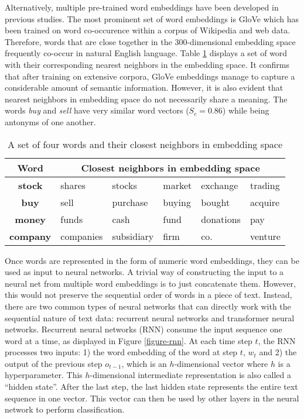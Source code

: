 Alternatively, multiple pre-trained word embeddings have been developed in previous studies. The most prominent set of word embeddings is GloVe  which has been trained on word co-occurence within a corpus of Wikipedia and web data. Therefore, words that are close together in the 300-dimensional embedding space frequently co-occur in natural English language. Table \ref{table-glove-demo} displays a set of word with their corresponding nearest neighbors in the embedding space. It confirms that after training on extensive corpora, GloVe embeddings manage to capture a considerable amount of semantic information. However, it is also evident that nearest neighbors in embedding space do not necessarily share a meaning. The words \emph{buy} and \emph{sell} have very similar word vectors ($S_c = 0.86$) while being antonyms of one another.




\begin{table}[!ht]
\centering

\begin{tabular}{clllll}
\toprule
\textbf{Word} & \multicolumn{5}{c}{\textbf{Closest neighbors in embedding space}}\\
\midrule

\textbf{stock} & shares & stocks & market & exchange & trading\\
\textbf{buy} & sell & purchase & buying & bought & acquire\\
\textbf{money} & funds & cash & fund & donations & pay\\
\textbf{company} & companies & subsidiary & firm & co. & venture\\

\bottomrule
\end{tabular}
\caption{A set of four words and their closest neighbors in embedding space}
\label{table-glove-demo}
\end{table}




%


Once words are represented in the form of numeric word embeddings, they can be used as input to neural networks. A trivial way of constructing the input to a neural net from multiple word embeddings is to just concatenate them. However, this would not preserve the sequential order of words in a piece of text. Instead, there are two common types of neural networks that can directly work with the sequential nature of text data: recurrent neural networks and transformer neural networks. Recurrent neural networks (RNN) consume the input sequence one word at a time, as displayed in Figure \ref{figure-rnn}. At each time step $t$, the RNN processes two inputs: 1) the word embedding of the word at step $t$, $w_t$ and 2) the output of the previous step $o_{t-1}$, which is an $h$-dimensional vector where $h$ is a hyperparameter. This $h$-dimensional intermediate representation is also called a ``hidden state''. After the last step, the last hidden state represents the entire text sequence in one vector. This vector can then be used by other layers in the neural network to perform classification. 

